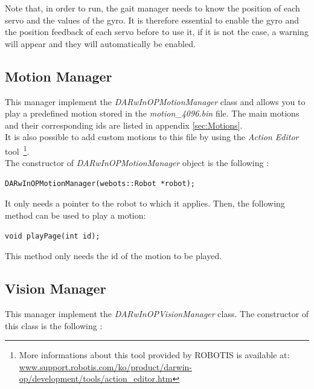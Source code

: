 \documentclass[a4paper, 12pt]{article}  		%
\begin{document}
Note that, in order to run, the gait manager needs to know the position of each servo and the values of the gyro. It is therefore essential to enable the gyro and the position feedback of each servo before to use it, if it is not the case, a warning will appear and they will automatically be enabled.\\

\subsection{Motion Manager}
This manager implement the \textit{DARwInOPMotionManager} class and allows you to play a predefined motion stored in the \textit{motion\_4096.bin} file. The main motions and their corresponding ids are listed in appendix \ref{sec:Motions}.\\

It is also possible to add custom motions to this file by using the \textit{Action Editor} tool \,\footnote{ More informations about this tool provided by ROBOTIS is available at: \url{www.support.robotis.com/ko/product/darwin-op/development/tools/action_editor.htm}}.\\

The constructor of \textit{DARwInOPMotionManager} object is the following :\\
\lstset{language=c++} 
\lstset{commentstyle=\textit} 
\begin{lstlisting} 
DARwInOPMotionManager(webots::Robot *robot);
\end{lstlisting}

It only needs a pointer to the robot to which it applies. Then, the following method can be used to play a motion:\\

\lstset{language=c++} 
\lstset{commentstyle=\textit} 
\begin{lstlisting} 
void playPage(int id);
\end{lstlisting}

This method only needs the id of the motion to be played.\\

\newpage
\subsection{Vision Manager}
This manager implement the \textit{DARwInOPVisionManager} class. The constructor of this class is the following :\\
\end{document}
